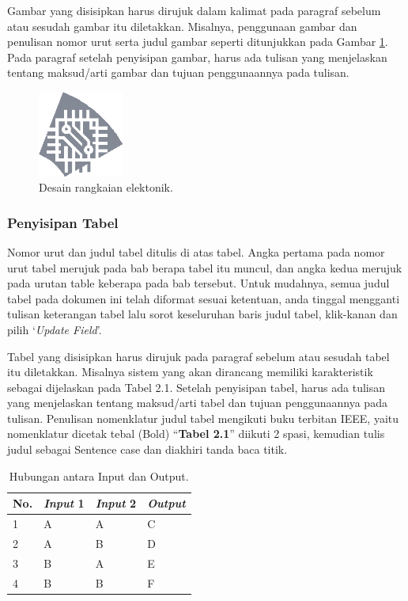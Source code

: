 \documentclass{thesis}
\begin{document}
Gambar yang disisipkan harus dirujuk dalam kalimat pada paragraf sebelum atau sesudah gambar itu diletakkan. Misalnya, penggunaan gambar dan penulisan nomor urut serta judul gambar seperti ditunjukkan pada Gambar \ref{fig:1}. Pada paragraf setelah penyisipan gambar, harus ada tulisan yang menjelaskan tentang maksud/arti gambar dan tujuan penggunaannya pada tulisan.

\begin{figure}[!ht]
    \centering
    \includegraphics[width=0.25\textwidth]{examplefig.png}
    \caption{Desain rangkaian elektonik.}
    \label{fig:1}
\end{figure}

\subsubsection{Penyisipan Tabel}

Nomor urut dan judul tabel ditulis di atas tabel. Angka pertama pada nomor urut tabel merujuk pada bab berapa tabel itu muncul, dan angka kedua merujuk pada urutan table keberapa pada bab tersebut. Untuk mudahnya, semua judul tabel pada dokumen ini telah diformat sesuai ketentuan, anda tinggal mengganti tulisan keterangan tabel lalu sorot keseluruhan baris judul tabel, klik-kanan dan pilih ‘\textit{Update Field}’.

Tabel yang disisipkan harus dirujuk pada paragraf sebelum atau sesudah tabel itu diletakkan. Misalnya sistem yang akan dirancang memiliki karakteristik sebagai dijelaskan pada Tabel 2.1. Setelah penyisipan tabel, harus ada tulisan yang menjelaskan tentang maksud/arti tabel dan tujuan penggunaannya pada tulisan. Penulisan nomenklatur judul tabel mengikuti buku terbitan IEEE, yaitu nomenklatur dicetak tebal (Bold) “\textbf{Tabel 2.1}” diikuti 2 spasi, kemudian tulis judul sebagai Sentence case dan diakhiri tanda baca titik.

\begin{table}[!ht]
\centering
\caption{Hubungan antara Input dan Output.}
\begin{tabular}{|p{10mm}|p{15mm}|p{15mm}|p{15mm}|} 
 \hline
 \rowcolor{lightgray}
 \textbf{No.} & \textbf{\textit{Input} 1} & \textbf{\textit{Input} 2} & \textbf{\textit{Output}} \\
 \hline
 1 & A & A & C \\ 
 \hline
 2 & A & B & D \\
 \hline
 3 & B & A & E \\
 \hline
 4 & B & B & F \\
 \hline
\end{tabular}
\label{table:2}
\end{table}
\end{document}
